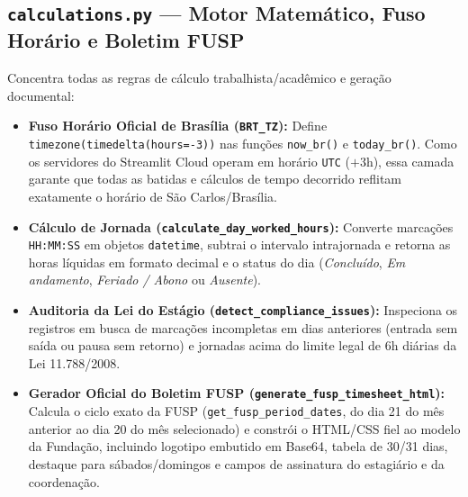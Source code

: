 \documentclass[11pt,a4paper]{article}
\begin{document}
\subsection{\texttt{calculations.py} --- Motor Matemático, Fuso Horário e Boletim FUSP}
Concentra todas as regras de cálculo trabalhista/acadêmico e geração documental:
\begin{itemize}[leftmargin=1.5em]
    \item \textbf{Fuso Horário Oficial de Brasília (\texttt{BRT\_TZ}):} Define \texttt{timezone(timedelta(hours=-3))} nas funções \texttt{now\_br()} e \texttt{today\_br()}. Como os servidores do Streamlit Cloud operam em horário \texttt{UTC} ($+3\text{h}$), essa camada garante que todas as batidas e cálculos de tempo decorrido reflitam exatamente o horário de São Carlos/Brasília.
    \item \textbf{Cálculo de Jornada (\texttt{calculate\_day\_worked\_hours}):} Converte marcações \texttt{HH:MM:SS} em objetos \texttt{datetime}, subtrai o intervalo intrajornada e retorna as horas líquidas em formato decimal e o status do dia (\textit{Concluído}, \textit{Em andamento}, \textit{Feriado / Abono} ou \textit{Ausente}).
    \item \textbf{Auditoria da Lei do Estágio (\texttt{detect\_compliance\_issues}):} Inspeciona os registros em busca de marcações incompletas em dias anteriores (entrada sem saída ou pausa sem retorno) e jornadas acima do limite legal de $6\text{h}$ diárias da Lei 11.788/2008.
    \item \textbf{Gerador Oficial do Boletim FUSP (\texttt{generate\_fusp\_timesheet\_html}):} Calcula o ciclo exato da FUSP (\texttt{get\_fusp\_period\_dates}, do dia 21 do mês anterior ao dia 20 do mês selecionado) e constrói o HTML/CSS fiel ao modelo da Fundação, incluindo logotipo embutido em Base64, tabela de 30/31 dias, destaque para sábados/domingos e campos de assinatura do estagiário e da coordenação.
\end{itemize}
\end{document}
